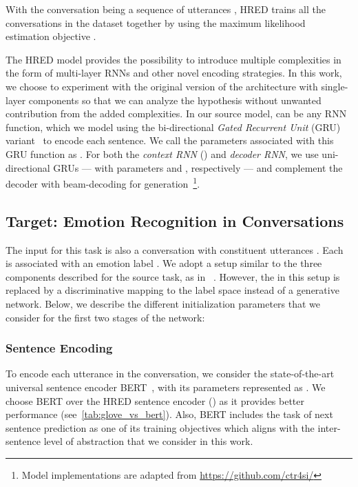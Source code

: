 \documentclass[preprint,3pt]{elsarticle}
\begin{document}
With the  conversation being a sequence of utterances , HRED trains all the conversations in the dataset together by using the maximum likelihood estimation objective .



The HRED model provides the possibility to introduce multiple complexities in the form of multi-layer RNNs and other novel encoding strategies. In this work, we choose to experiment with the original version of the architecture with single-layer components so that we can analyze the hypothesis without unwanted contribution from the added complexities. In our source model,  can be any RNN function, which we model using the bi-directional \textit{Gated Recurrent Unit} (GRU) variant~\cite{cho2014learning} to encode each sentence. We call the parameters associated with this GRU function as . For both the \textit{context RNN} () and \textit{decoder RNN}, we use uni-directional GRUs --- with parameters  and , respectively --- and complement the decoder with beam-decoding for generation~\footnote{Model implementations are adapted from \protect\url{https://github.com/ctr4si/}}.




\subsection{Target: Emotion Recognition in Conversations}

The input for this task is also a conversation  with constituent utterances . Each  is associated with an emotion label . We adopt a setup similar to the three components described for the source task, as in ~\citet{poria2017context}. However, the  in this setup is replaced by a discriminative mapping to the label space instead of a generative network. Below, we describe the different initialization parameters that we consider for the first two stages of the network:

\subsubsection{Sentence Encoding} 
To encode each utterance in the conversation, we consider the state-of-the-art universal sentence encoder BERT~\cite{devlin2018bert}, with its parameters represented as . We choose BERT over the HRED sentence encoder () as it provides better performance (see~\cref{tab:glove_vs_bert}). Also, BERT includes the task of next sentence prediction as one of its training objectives which aligns with the inter-sentence level of abstraction that we consider in this work. 
\end{document}
